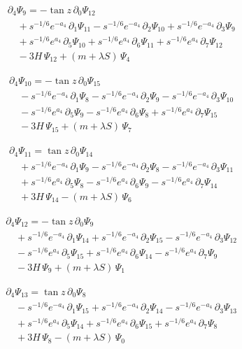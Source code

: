 \documentclass[11pt]{article}
\begin{document}
\[
\begin{aligned}
&\partial_{4}\Psi_{9}=-\tan z\,\partial_{0}\Psi_{12} \\
&\quad +s^{-1/6}e^{-a_4}\,\partial_{1}\Psi_{11}-s^{-1/6}e^{-a_4}\,\partial_{2}\Psi_{10}+s^{-1/6}e^{-a_4}\,\partial_{3}\Psi_{9} \\
&\quad +s^{-1/6}e^{a_4}\,\partial_{5}\Psi_{10}+s^{-1/6}e^{a_4}\,\partial_{6}\Psi_{11}+s^{-1/6}e^{a_4}\,\partial_{7}\Psi_{12} \\
&\quad -3H\,\Psi_{12}+(m+\lambda S)\,\Psi_{4}
\end{aligned}\tag{V9}
\]

\[
\begin{aligned}
&\partial_{4}\Psi_{10}=-\tan z\,\partial_{0}\Psi_{15} \\
&\quad -s^{-1/6}e^{-a_4}\,\partial_{1}\Psi_{8}-s^{-1/6}e^{-a_4}\,\partial_{2}\Psi_{9}-s^{-1/6}e^{-a_4}\,\partial_{3}\Psi_{10} \\
&\quad -s^{-1/6}e^{a_4}\,\partial_{5}\Psi_{9}-s^{-1/6}e^{a_4}\,\partial_{6}\Psi_{8}+s^{-1/6}e^{a_4}\,\partial_{7}\Psi_{15} \\
&\quad -3H\,\Psi_{15}+(m+\lambda S)\,\Psi_{7}
\end{aligned}\tag{V10}
\]

\[
\begin{aligned}
&\partial_{4}\Psi_{11}=\tan z\,\partial_{0}\Psi_{14} \\
&\quad +s^{-1/6}e^{-a_4}\,\partial_{1}\Psi_{9}-s^{-1/6}e^{-a_4}\,\partial_{2}\Psi_{8}-s^{-1/6}e^{-a_4}\,\partial_{3}\Psi_{11} \\
&\quad +s^{-1/6}e^{a_4}\,\partial_{5}\Psi_{8}-s^{-1/6}e^{a_4}\,\partial_{6}\Psi_{9}-s^{-1/6}e^{a_4}\,\partial_{7}\Psi_{14} \\
&\quad +3H\,\Psi_{14}-(m+\lambda S)\,\Psi_{6}
\end{aligned}\tag{V11}
\]

\[
\begin{aligned}
&\partial_{4}\Psi_{12}=-\tan z\,\partial_{0}\Psi_{9} \\
&\quad +s^{-1/6}e^{-a_4}\,\partial_{1}\Psi_{14}+s^{-1/6}e^{-a_4}\,\partial_{2}\Psi_{15}-s^{-1/6}e^{-a_4}\,\partial_{3}\Psi_{12} \\
&\quad -s^{-1/6}e^{a_4}\,\partial_{5}\Psi_{15}+s^{-1/6}e^{a_4}\,\partial_{6}\Psi_{14}-s^{-1/6}e^{a_4}\,\partial_{7}\Psi_{9} \\
&\quad -3H\,\Psi_{9}+(m+\lambda S)\,\Psi_{1}
\end{aligned}\tag{V12}
\]

\[
\begin{aligned}
&\partial_{4}\Psi_{13}=\tan z\,\partial_{0}\Psi_{8} \\
&\quad -s^{-1/6}e^{-a_4}\,\partial_{1}\Psi_{15}+s^{-1/6}e^{-a_4}\,\partial_{2}\Psi_{14}-s^{-1/6}e^{-a_4}\,\partial_{3}\Psi_{13} \\
&\quad +s^{-1/6}e^{a_4}\,\partial_{5}\Psi_{14}+s^{-1/6}e^{a_4}\,\partial_{6}\Psi_{15}+s^{-1/6}e^{a_4}\,\partial_{7}\Psi_{8} \\
&\quad +3H\,\Psi_{8}-(m+\lambda S)\,\Psi_{0}
\end{aligned}\tag{V13}
\]
\end{document}
